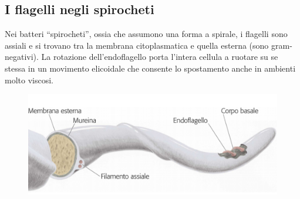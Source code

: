 \subsection{I flagelli negli spirocheti}
Nei batteri “spirocheti”, ossia che assumono una forma a spirale, i flagelli sono assiali e si trovano tra la membrana citoplasmatica e quella esterna (sono 
gram-negativi). La rotazione dell’endoflagello porta l’intera cellula a ruotare su se stessa in un movimento elicoidale che consente lo spostamento anche in 
ambienti molto viscosi.
\begin{figure}[H]
	\includegraphics[width=\textwidth]{Pictures/20.png}
\end{figure}